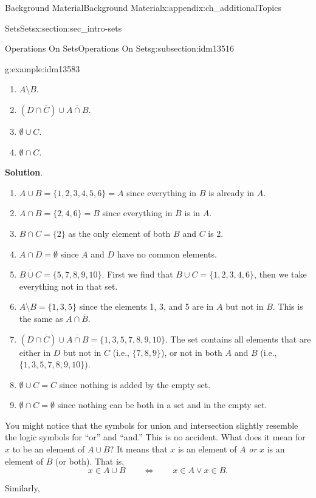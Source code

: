 \documentclass[oneside,10pt,]{book}
\numberwithin{equation}{chapter}
\def\Iff{\Leftrightarrow}
\begin{document}
\begin{appendixptx}{Background Material}{}{Background Material}{}{}{x:appendix:ch_additionalTopics}
\begin{sectionptx}{Sets}{}{Sets}{}{}{x:section:sec_intro-sets}
\begin{subsectionptx}{Operations On Sets}{}{Operations On Sets}{}{}{g:subsection:idm13516}
\begin{example}{}{g:example:idm13583}
\begin{enumerate}
\item{}\(A \setminus B\).%
\item{}\((D \cap \overline C) \cup \overline{A \cap B}\).%
\item{}\(\emptyset \cup C\).%
\item{}\(\emptyset \cap C\).%
\end{enumerate}
%
\par\smallskip%
\noindent\textbf{Solution}.\hypertarget{g:solution:idm13610}{}\quad{}%
\begin{enumerate}
\item{}\(A \cup B = \{1, 2, 3, 4, 5, 6\} = A\) since everything in \(B\) is already in \(A\).%
\item{}\(A \cap B = \{2, 4, 6\} = B\) since everything in \(B\) is in \(A\).%
\item{}\(B \cap C = \{2\}\) as the only element of both \(B\) and \(C\) is 2.%
\item{}\(A \cap D = \emptyset\) since \(A\) and \(D\) have no common elements.%
\item{}\(\overline{B \cup C} = \{5, 7, 8, 9, 10\}\). First we find that \(B \cup C = \{1, 2, 3, 4, 6\}\), then we take everything not in that set.%
\item{}\(A \setminus B = \{1, 3, 5\}\) since the elements 1, 3, and 5 are in \(A\) but not in \(B\). This is the same as \(A \cap \overline B\).%
\item{}\((D \cap \overline C) \cup \overline{A \cap B} = \{1, 3, 5, 7, 8, 9, 10\}.\) The set contains all elements that are either in \(D\) but not in \(C\) (i.e., \(\{7,8,9\}\)), or not in both \(A\) and \(B\) (i.e., \(\{1,3,5,7,8,9,10\}\)).%
\item{}\(\emptyset \cup C = C\) since nothing is added by the empty set.%
\item{}\(\emptyset \cap C = \emptyset\) since nothing can be both in a set and in the empty set.%
\end{enumerate}
%
\end{example}
You might notice that the symbols for union and intersection slightly resemble the logic symbols for ``or'' and ``and.'' This is no accident. What does it mean for \(x\) to be an element of \(A\cup B\)? It means that \(x\) is an element of \(A\) \emph{or} \(x\) is an element of \(B\) (or both). That is,%
\begin{equation*}
x \in A \cup B \qquad \Iff \qquad x \in A \vee x \in B.
\end{equation*}
%
\par
Similarly,%
\begin{equation*}

\end{equation*}
\end{subsectionptx}
\end{sectionptx}
\end{appendixptx}
\end{document}
